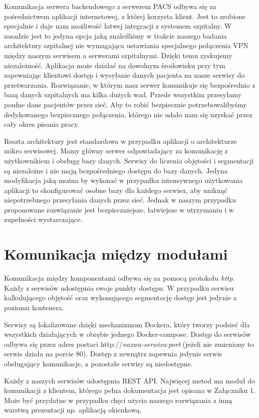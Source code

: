 \documentclass[a4paper,11pt,twoside]{report}
\theoremstyle{definition}
\begin{document}
Komunikacja serwera backendowego z serwerem PACS odbywa się za pośrednictwem aplikacji internetowej, z której korzysta klient. Jest to zrobione specjalnie i daje nam możliwość łatwej integracji z systemem szpitalny. W zasadzie jest to jedyna opcja jaką znaleźliśmy w trakcie naszego badania architektury szpitalnej nie wymagająca ustawiania specjalnego połączenia VPN między naszym serwisem a serwerami szpitalnymi. Dzięki temu zyskujemy niezależność. Aplikacja może działać na dowolnym środowisku przy tym zapewniając klientowi dostęp i wysyłanie danych pacjenta na nasze serwisy do przetwarzania.
Rozwiązanie, w którym nasz serwer komunikuje się bezpośrednio z bazą danych szpitalnych ma kilka dużych wad. Przede wszystkim przesyłamy poufne dane pacjentów przez sieć. Aby to robić bezpiecznie potrzebowalibyśmy dedykowanego bezpiecznego połączenia, którego nie udało nam się uzyskać przez cały okres pisania pracy.
\par
Reszta architektury jest standardowa w przypadku aplikacji o architekturze mikro serwisowej. Mamy główny serwer odpowiadający za komunikację z użytkownikiem i obsługę bazy danych. Serwisy do liczenia objętości i segmentacji są niezależne i nie mają bezpośredniego dostępu do bazy danych.
Jedyna modyfikacja jaką można by wykonać w przypadku intensywnego użytkowania aplikacji to skonfigurować osobne bazy dla każdego serwisu, aby uniknąć niepotrzebnego przesyłania danych przez sieć. Jednak w naszym przypadku proponowane rozwiązanie jest bezpieczniejsze, łatwiejsze w utrzymaniu i w zupełności wystarczające.

\section{Komunikacja między modułami}

Komunikacja między komponentami odbywa się za pomocą protokołu \textit{http}. Każdy z serwisów udostępnia swoje punkty dostępu. W przypadku serwisu kalkulującego objętość oraz wykonującego segmentację dostęp jest jedynie z poziomu kontenera.
\par
Serwisy są lokalizowane dzięki mechanizmom Dockera, który tworzy podsieć dla wszystkich działających w obrębie jednego Docker-compose. Dostęp do serwisów odbywa się przez adres postaci http://\textit{nazwa-serwisu}:\textit{port} (jeżeli nie zmieniony to serwis działa na porcie 80). Dostęp z zewnątrz zapewnia jedynie serwis obsługujący komunikacje, a pozostałe serwisy są niedostępne.
\par
Każdy z naszych serwisów udostępnia REST API. Najwięcej metod ma moduł do komunikacji z klientem, którego pełna dokumentacja jest opisana w Załączniku 1. Może być przydatne w przypadku chęci użycia naszego rozwiązania z inną warstwą prezentacji np. aplikacją okienkową.
\end{document}
